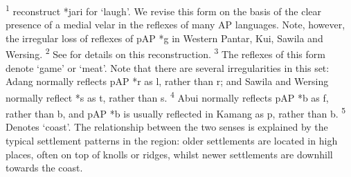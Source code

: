 \raggedright

\textsuperscript{1} \citet{HoltonEtAl2012} reconstruct *jari for `laugh'. We revise this form on the basis of the clear presence of a medial velar in the reflexes of many AP languages. Note, however, the irregular loss of reflexes of pAP *g in Western Pantar, Kui, Sawila and Wersing.  \textsuperscript{2} See \citet{SchapperTVelevation} for details on this reconstruction.  \textsuperscript{3} The reflexes of this form denote `game' or `meat'. Note that there are several irregularities in this set: Adang normally reflects pAP *r as l, rather than r; and Sawila and Wersing normally reflect *s as t, rather than s.  \textsuperscript{4} Abui normally reflects pAP *b as f, rather than b, and pAP *b is usually reflected in Kamang as p, rather than b.  \textsuperscript{5} Denotes `coast'. The relationship between the two senses is explained by the typical settlement patterns in the region: older settlements are located in high places, often on top of knolls or ridges, whilst newer settlements are downhill towards the coast.




